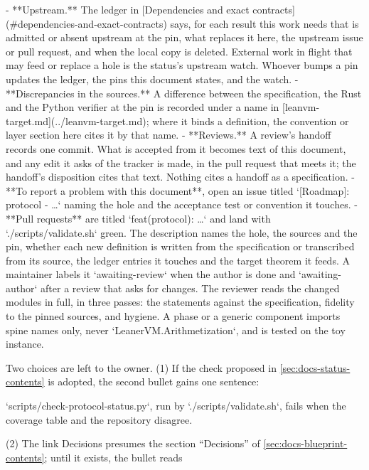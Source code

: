 \begin{srccode}
- **Upstream.** The ledger in [Dependencies and exact contracts](#dependencies-and-exact-contracts)
  says, for each result this work needs that is admitted or absent upstream at the pin, what
  replaces it here, the upstream issue or pull request, and when the local copy is deleted.
  External work in flight that may feed or replace a hole is the status's upstream watch.
  Whoever bumps a pin updates the ledger, the pins this document states, and the watch.
- **Discrepancies in the sources.** A difference between the specification, the Rust and the
  Python verifier at the pin is recorded under a name in
  [leanvm-target.md](../leanvm-target.md); where it binds a definition, the convention or
  layer section here cites it by that name.
- **Reviews.** A review's handoff records one commit. What is accepted from it becomes text of
  this document, and any edit it asks of the tracker is made, in the pull request that meets
  it; the handoff's disposition cites that text. Nothing cites a handoff as a specification.
- **To report a problem with this document**, open an issue titled `[Roadmap]: protocol - …`
  naming the hole and the acceptance test or convention it touches.
- **Pull requests** are titled `feat(protocol): …` and land with `./scripts/validate.sh`
  green. The description names the hole, the sources and the pin, whether each new definition
  is written from the specification or transcribed from its source, the ledger entries it
  touches and the target theorem it feeds. A maintainer labels it `awaiting-review` when the
  author is done and `awaiting-author` after a review that asks for changes. The reviewer reads
  the changed modules in full, in three passes: the statements against the specification,
  fidelity to the pinned sources, and hygiene. A phase or a generic component imports spine
  names only, never `LeanerVM.Arithmetization`, and is tested on the toy instance.
\end{srccode}

Two choices are left to the owner. (1) If the check proposed in \cref{sec:docs-status-contents} is adopted, the second bullet gains one sentence:

\begin{srccode}
`scripts/check-protocol-status.py`, run by `./scripts/validate.sh`, fails when the coverage table and the repository disagree.
\end{srccode}

(2) The link Decisions presumes the section ``Decisions'' of \cref{sec:docs-blueprint-contents}; until it exists, the bullet reads

